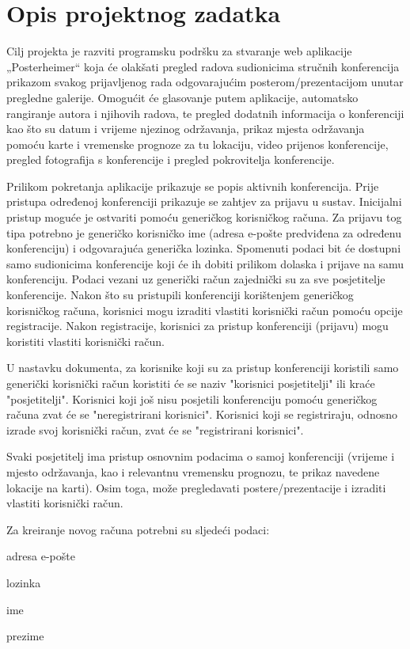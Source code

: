 \chapter{Opis projektnog zadatka}
		
		Cilj projekta je razviti programsku podršku za stvaranje web aplikacije „Posterheimer“ koja će olakšati pregled radova sudionicima stručnih konferencija prikazom svakog prijavljenog rada odgovarajućim posterom/prezentacijom unutar pregledne galerije. Omogućit će glasovanje putem aplikacije, automatsko rangiranje autora i njihovih radova, te pregled dodatnih informacija o konferenciji kao što su datum i vrijeme njezinog održavanja, prikaz mjesta održavanja pomoću karte i vremenske prognoze za tu lokaciju, video prijenos konferencije, pregled fotografija s konferencije i pregled pokrovitelja konferencije.
		
		Prilikom pokretanja aplikacije prikazuje se popis aktivnih konferencija. Prije pristupa određenoj konferenciji prikazuje se zahtjev za prijavu u sustav. Inicijalni pristup moguće je ostvariti pomoću generičkog korisničkog računa. Za prijavu tog tipa potrebno je generičko korisničko ime (adresa e-pošte predviđena za određenu konferenciju) i odgovarajuća generička lozinka. Spomenuti podaci bit će dostupni samo sudionicima konferencije koji će ih dobiti prilikom dolaska i prijave na samu konferenciju. Podaci vezani uz generički račun zajednički su za sve posjetitelje konferencije. Nakon što su pristupili konferenciji korištenjem generičkog korisničkog računa, korisnici mogu izraditi vlastiti korisnički račun pomoću opcije registracije. Nakon registracije, korisnici za pristup konferenciji (prijavu) mogu koristiti vlastiti korisnički račun. 

		U nastavku dokumenta, za korisnike koji su za pristup konferenciji koristili samo generički korisnički račun koristiti će se naziv "korisnici posjetitelji" ili kraće "posjetitelji". Korisnici koji još nisu posjetili konferenciju pomoću generičkog računa zvat će se "neregistrirani korisnici". Korisnici koji se registriraju, odnosno izrade svoj korisnički račun, zvat će se "registrirani korisnici". 
		
		Svaki posjetitelj ima pristup osnovnim podacima o samoj konferenciji (vrijeme i mjesto održavanja, kao i relevantnu vremensku prognozu, te prikaz navedene lokacije na karti). Osim toga, može pregledavati postere/prezentacije i izraditi vlastiti korisnički račun.
		
		Za kreiranje novog računa potrebni su sljedeći podaci:
		\begin{packed_item}
			\item adresa e-pošte
			\item lozinka
			\item ime
			\item prezime
		\end{packed_item}
		
